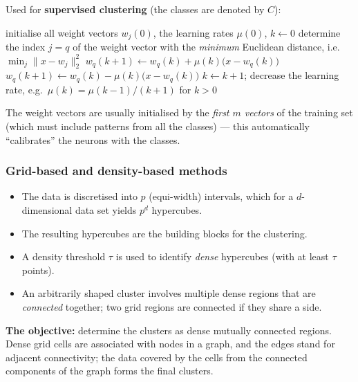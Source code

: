 \documentclass[11pt,a4paper]{article}
\theoremstyle{definition}
\providecommand{\uv}[1]{``#1''}
\begin{document}
\begin{defbox}
Used for \textbf{supervised clustering} (the classes are denoted by $C$):
\begin{algorithmic}[1]
\State initialise all weight vectors $w_j(0)$, the learning rates $\mu(0)$, $k\gets 0$
     \State determine the index $j=q$ of the weight vector with the \emph{minimum} Euclidean
            distance, i.e.\ $\min_j\|x-w_j\|_2^2$
        \State $w_q(k+1)\gets w_q(k)+\mu(k)\big(x-w_q(k)\big)$ 
     \Else
        \State $w_q(k+1)\gets w_q(k)-\mu(k)\big(x-w_q(k)\big)$ 
     \EndIf
  \EndFor
  \State $k\gets k+1$; decrease the learning rate, e.g.\ $\mu(k)=\mu(k-1)/(k+1)$ for $k>0$
\EndWhile
\end{algorithmic}
The weight vectors are usually initialised by the \emph{first $m$ vectors} of the training set
(which must include patterns from all the classes) --- this automatically \uv{calibrates} the
neurons with the classes.
\end{defbox}

\subsubsection{Grid-based and density-based methods}

\begin{defbox}
\begin{itemize}
\item The data is discretised into $p$ (equi-width) intervals, which for a $d$-dimensional data set
      yields $p^d$ hypercubes.
\item The resulting hypercubes are the building blocks for the clustering.
\item A density threshold $\tau$ is used to identify \emph{dense} hypercubes (with at least $\tau$
      points).
\item An arbitrarily shaped cluster involves multiple dense regions that are \emph{connected}
      together; two grid regions are connected if they share a side.
\end{itemize}
\textbf{The objective:} determine the clusters as dense mutually connected regions. Dense grid
cells are associated with nodes in a graph, and the edges stand for adjacent connectivity; the data
covered by the cells from the connected components of the graph forms the final clusters.
\end{defbox}
\end{document}
